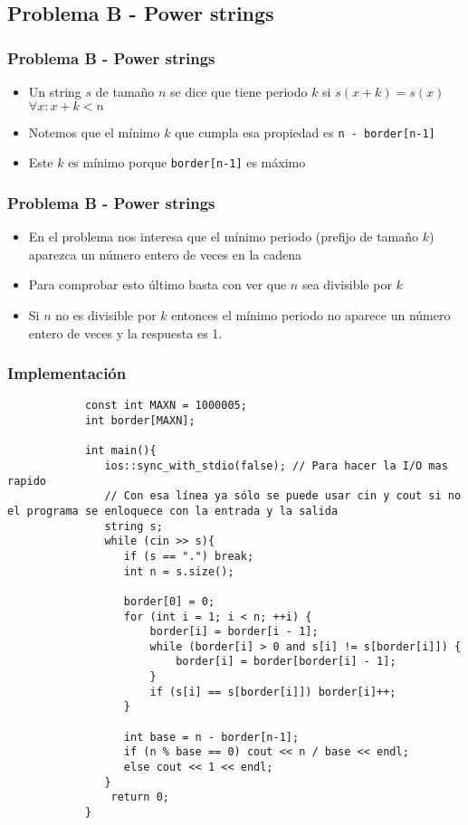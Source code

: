 \documentclass{beamer}
\begin{document}
	\subsection{Problema B - Power strings}
	\begin{frame}[fragile]
		\frametitle{Problema B - Power strings}
		\begin{itemize}
			\item Un string $s$ de tamaño $n$ se dice que tiene periodo $k$ si $s(x + k) = s(x)$ $\forall x : x + k < n$
			\item Notemos que el mínimo $k$ que cumpla esa propiedad es \verb|n - border[n-1]|
			\item Este $k$ es mínimo porque \verb|border[n-1]| es máximo
		\end{itemize}
	\end{frame}
	
	
	\begin{frame}[fragile]
		\frametitle{Problema B - Power strings}
		\begin{itemize}
			\item En el problema nos interesa que el mínimo periodo (prefijo de tamaño $k$) aparezca un número entero de veces en la cadena
			\item Para comprobar esto último basta con ver que $n$ sea divisible por $k$
			\item Si $n$ no es divisible por $k$ entonces el mínimo periodo no aparece un número entero de veces y la respuesta es 1.
		\end{itemize}
	\end{frame}
	
	\begin{frame}
		\frametitle{Implementación}
		\begin{lstlisting}
			const int MAXN = 1000005;
			int border[MAXN];

			int main(){
			   ios::sync_with_stdio(false); // Para hacer la I/O mas rapido
			   // Con esa línea ya sólo se puede usar cin y cout si no el programa se enloquece con la entrada y la salida
			   string s;
			   while (cin >> s){
			      if (s == ".") break;
			      int n = s.size();

			      border[0] = 0; 
			      for (int i = 1; i < n; ++i) {
			          border[i] = border[i - 1];
			          while (border[i] > 0 and s[i] != s[border[i]]) {
			              border[i] = border[border[i] - 1];
			          }
			          if (s[i] == s[border[i]]) border[i]++;
			      }

			      int base = n - border[n-1];
			      if (n % base == 0) cout << n / base << endl;
			      else cout << 1 << endl;
			   }
			    return 0;
			}
		\end{lstlisting}
	\end{frame}
\end{document}
